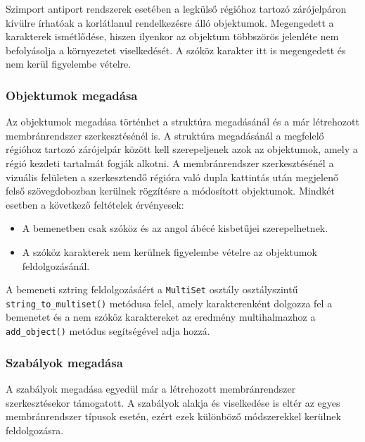 Szimport antiport rendszerek esetében a legkülső régióhoz tartozó zárójelpáron kívülre írhatóak a korlátlanul rendelkezésre álló objektumok. Megengedett a karakterek ismétlődése, hiszen ilyenkor  az objektum többszörös jelenléte nem befolyásolja a környezetet viselkedését. A szóköz karakter itt is megengedett és nem kerül figyelembe vételre.

\subsubsection{Objektumok megadása}
Az objektumok megadása történhet a struktúra megadásánál és a már létrehozott membránrendszer szerkesztésénél is. A struktúra megadásánál a megfelelő régióhoz tartozó zárójelpár között kell szerepeljenek azok az objektumok, amely a régió kezdeti tartalmát fogják alkotni. A membránrendszer szerkesztésénél a vizuális felületen a szerkesztendő régióra való dupla kattintás után megjelenő felső szövegdobozban kerülnek rögzítésre a módosított objektumok. Mindkét esetben a következő feltételek érvényesek:

\begin{itemize}
\item A bemenetben csak szóköz és az angol ábécé kisbetűjei szerepelhetnek.
\item A szóköz karakterek nem kerülnek figyelembe vételre az objektumok feldolgozásánál.
\end{itemize}

A bemeneti sztring feldolgozásáért a \verb|MultiSet| osztály osztályszintű \verb|string_to_multiset()| metódusa felel, amely karakterenként dolgozza fel a bemenetet és a nem szóköz karaktereket az eredmény multihalmazhoz a \verb|add_object()| metódus segítségével adja hozzá.

\subsubsection{Szabályok megadása}

A szabályok megadása egyedül már a létrehozott membránrendszer szerkesztésekor támogatott. A szabályok alakja és viselkedése is eltér az egyes membránrendszer típusok esetén, ezért ezek különböző módszerekkel kerülnek feldolgozásra.

